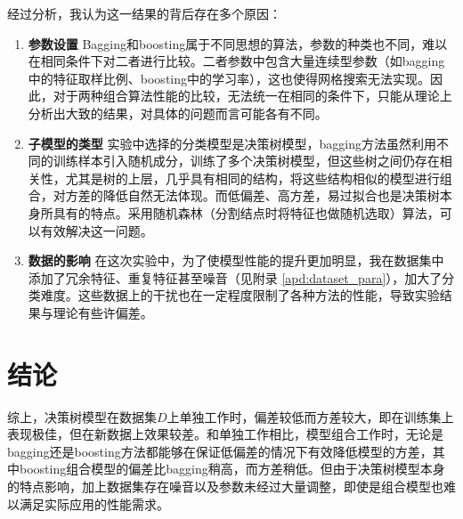 \documentclass[12pt,a4paper]{article}
\theoremstyle{definition}
\begin{document}
\vspace{0.015\linewidth}
经过分析，我认为这一结果的背后存在多个原因：

\begin{enumerate}

\item \textbf{参数设置  } Bagging和boosting属于不同思想的算法，参数的种类也不同，难以在相同条件下对二者进行比较。二者参数中包含大量连续型参数（如bagging中的特征取样比例、boosting中的学习率），这也使得网格搜索无法实现。因此，对于两种组合算法性能的比较，无法统一在相同的条件下，只能从理论上分析出大致的结果，对具体的问题而言可能各有不同。

\item \textbf{子模型的类型  } 实验中选择的分类模型是决策树模型，bagging方法虽然利用不同的训练样本引入随机成分，训练了多个决策树模型，但这些树之间仍存在相关性，尤其是树的上层，几乎具有相同的结构，将这些结构相似的模型进行组合，对方差的降低自然无法体现。而低偏差、高方差，易过拟合也是决策树本身所具有的特点。采用随机森林（分割结点时将特征也做随机选取）算法，可以有效解决这一问题。

\item \textbf{数据的影响  } 在这次实验中，为了使模型性能的提升更加明显，我在数据集中添加了冗余特征、重复特征甚至噪音（见附录 \ref{apd:dataset_para}），加大了分类难度。这些数据上的干扰也在一定程度限制了各种方法的性能，导致实验结果与理论有些许偏差。

\end{enumerate}

\section{结论}

综上，决策树模型在数据集$D$上单独工作时，偏差较低而方差较大，即在训练集上表现极佳，但在新数据上效果较差。和单独工作相比，模型组合工作时，无论是bagging还是boosting方法都能够在保证低偏差的情况下有效降低模型的方差，其中boosting组合模型的偏差比bagging稍高，而方差稍低。但由于决策树模型本身的特点影响，加上数据集存在噪音以及参数未经过大量调整，即使是组合模型也难以满足实际应用的性能需求。
\end{document}

